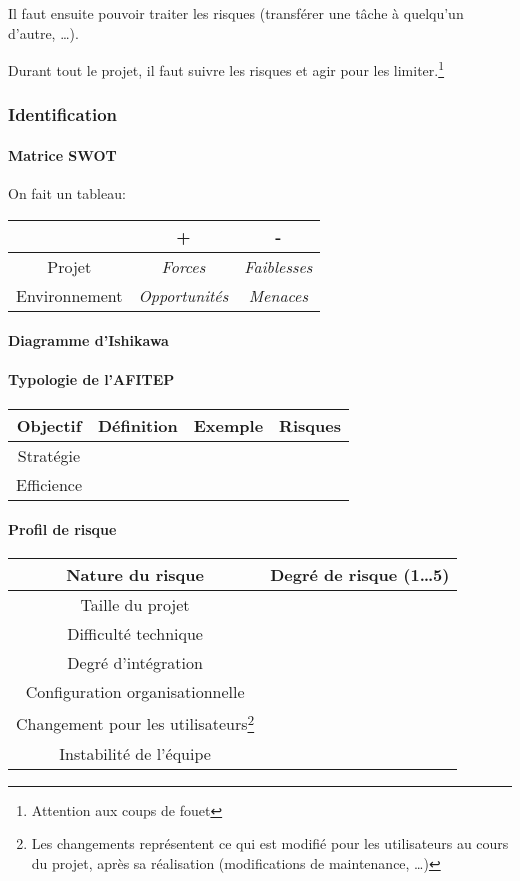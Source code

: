 \documentclass[10pt,a4paper,french]{article}
\begin{document}
Il faut ensuite pouvoir traiter les risques (transférer une tâche à quelqu'un d'autre, \dots).

Durant tout le projet, il faut suivre les risques et agir pour les limiter.\footnote{Attention aux coups de fouet}

\subsubsection{Identification}

\paragraph{Matrice SWOT}
On fait un tableau:
\begin{tabular}{c|cc}
& + & - \\
\hline
Projet & \textit{Forces} & \textit{Faiblesses} \\
Environnement & \textit{Opportunités} & \textit{Menaces}
\end{tabular}

\paragraph{Diagramme d'Ishikawa}

\paragraph{Typologie de l'AFITEP}
\begin{tabular}{c|ccc}
Objectif & Définition & Exemple & Risques \\
\hline
Stratégie & & & \\
Efficience & & &
\end{tabular}

\paragraph{Profil de risque}
\begin{tabular}{c|c}
Nature du risque & Degré de risque (1\ldots 5) \\
\hline
Taille du projet & \\
Difficulté technique & \\
Degré d'intégration & \\
Configuration organisationnelle & \\
Changement pour les utilisateurs\footnote{Les changements représentent ce qui est modifié pour les utilisateurs au cours du projet, après sa réalisation (modifications de maintenance, \ldots)} & \\
Instabilité de l'équipe & \\
\end{tabular}
\end{document}
